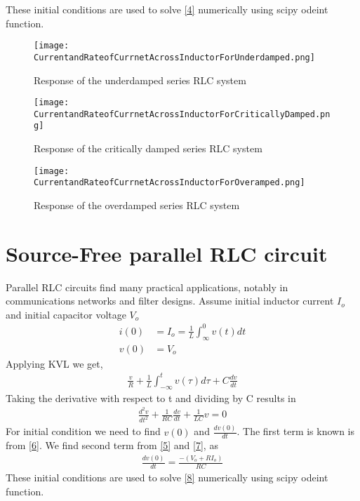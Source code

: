 \documentclass[11pt,a4paper]{article}
\begin{document}
These initial conditions are used to solve \ref{4} numerically using scipy odeint function.

\begin{figure}[H]
\texttt{[image: CurrentandRateofCurrnetAcrossInductorForUnderdamped.png]}
\caption{Response of the underdamped series RLC system }
\centering
\end{figure}

\begin{figure}[H]
\texttt{[image: CurrentandRateofCurrnetAcrossInductorForCriticallyDamped.png]}
\caption{Response of the critically damped series RLC system }
\centering
\end{figure}

\begin{figure}[H]
\texttt{[image: CurrentandRateofCurrnetAcrossInductorForOveramped.png]}
\caption{Response of the overdamped series RLC system }
\centering
\end{figure}

\section{Source-Free parallel RLC circuit}
Parallel RLC circuits find many practical applications, notably in communications networks and filter designs.
Assume initial inductor current $I_o$ and initial capacitor voltage $V_o$ 
\begin{align}
i(0) &= I_o = \frac{1}{L}\int_{\infty}^{0}v(t)dt \label{5}\\
v(0) &= V_o \label{6}
\end{align}
Applying KVL we get,
 \begin{align}
 \frac{v}{R} + \frac{1}{L}\int_{-\infty}^tv(\tau)d\tau + C\frac{dv}{dt} \label{7}
 \end{align}
 Taking the derivative with respect to t and dividing by C results in
 \begin{align}
 \frac{d^2v}{dt^2} + \frac{1}{RC}\frac{dv}{dt} + \frac{1}{LC}v =0 \label{8}
 \end{align}
 For initial condition we need to find $v(0)$ and $\frac{dv(0)}{dt}$. The first term is known is from \ref{6}.
 We find second term from \ref{5} and \ref{7}, as
 \begin{align}
 \frac{dv(0)}{dt} = \frac{-(V_o+RI_o)}{RC}
 \end{align}
 These initial conditions are used to solve \ref{8} numerically using scipy odeint function.
 
\end{document}
